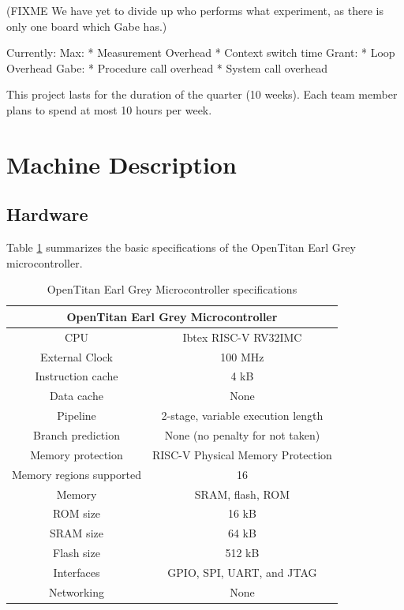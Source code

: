 \documentclass{article}
\begin{document}
(FIXME We have yet to divide up who performs what experiment, as there is only one board which Gabe has.)

Currently:
Max:
* Measurement Overhead
* Context switch time
Grant:
* Loop Overhead
Gabe:
* Procedure call overhead
* System call overhead

This project lasts for the duration of the quarter (10 weeks). Each team member plans to spend at most 10 hours per week.

\section{Machine Description}

\subsection{Hardware}
Table \ref{table:1} summarizes the basic specifications of the OpenTitan Earl Grey microcontroller.

\begin{table}[H]
\centering
    \begin{tabular}{|c|c|}
        \hline
        \multicolumn{2}{|c|}{OpenTitan Earl Grey Microcontroller} \\
        \hline
        \hline
        CPU & Ibtex RISC-V RV32IMC \\
        \hline
        External Clock & 100 MHz \\
        \hline
        Instruction cache & 4 kB \\
        \hline
        Data cache & None \\
        \hline
        Pipeline & 2-stage, variable execution length \\
        \hline
        Branch prediction & None (no penalty for not taken) \\
        \hline
        Memory protection & RISC-V Physical Memory Protection\cite{riscv-priv} \\
        \hline
        Memory regions supported & 16 \\
        \hline
        Memory & SRAM, flash, ROM \\
        \hline
        ROM size & 16 kB \\
        \hline
        SRAM size & 64 kB \\
        \hline
        Flash size & 512 kB \\
        \hline
        Interfaces & GPIO, SPI, UART, and JTAG \\
        \hline
        Networking & None \\
        \hline
    \end{tabular}
\caption{OpenTitan Earl Grey Microcontroller specifications}
\label{table:1}
\end{table}
\end{document}
